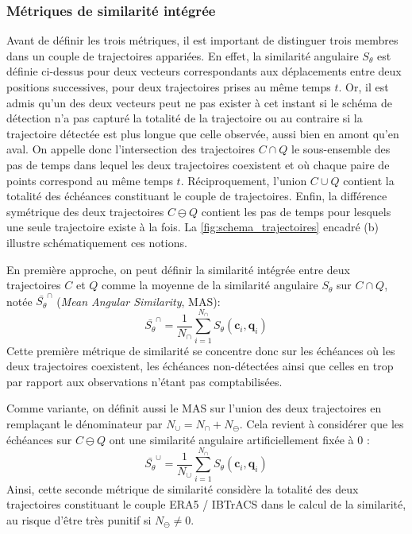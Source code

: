 \documentclass[../main.tex]{subfiles}
\begin{document}
\subsubsection*{Métriques de similarité intégrée}\label{sec:definition_MAS}

Avant de définir les trois métriques, il est important de distinguer trois membres dans un couple de trajectoires appariées. En effet, la similarité angulaire
$S_\theta$ est définie ci-dessus pour deux vecteurs correspondants aux déplacements entre deux positions successives, pour deux trajectoires prises au même
temps $t$. Or, il est admis qu'un des deux vecteurs peut ne pas exister à cet instant si le schéma de détection n'a pas capturé la totalité de la trajectoire ou
au contraire si la trajectoire détectée est plus longue que celle observée, aussi bien en amont qu'en aval. On appelle donc l'intersection des trajectoires $C
\cap Q$ le sous-ensemble des pas de temps dans lequel les deux trajectoires coexistent et où chaque paire de points correspond au même temps $t$.
Réciproquement, l'union $C \cup Q$ contient la totalité des échéances constituant le couple de trajectoires. Enfin, la différence symétrique des deux
trajectoires $C \ominus Q$ contient les pas de temps pour lesquels une seule trajectoire existe à la fois. La \cref{fig:schema_trajectoires} encadré (b)
illustre schématiquement ces notions.

En première approche, on peut définir la similarité intégrée entre deux trajectoires $C$ et $Q$ comme la moyenne de la similarité angulaire $S_\theta$ sur $C
\cap Q$, notée $\bar{S_\theta}^\cap$ (\textit{Mean Angular Similarity}, MAS):
%
\begin{equation}
    \bar{S_\theta}^\cap = \frac{1}{N_\cap} \sum_{i=1}^{N_\cap} S_\theta (\mathbf{c}_i, \mathbf{q}_i) \tag*{MAS$^\cap$}
\end{equation}
%
Cette première métrique de similarité se concentre donc sur les échéances où les deux trajectoires coexistent, les échéances non-détectées ainsi que celles en
trop par rapport aux observations n'étant pas comptabilisées.

Comme variante, on définit aussi le MAS sur l'union des deux trajectoires en remplaçant le dénominateur par $N_\cup = N_\cap + N_\ominus$. Cela revient
à considérer que les échéances sur $C \ominus Q$ ont une similarité angulaire artificiellement fixée à \num{0} :
%
\begin{equation}
    \bar{S_\theta}^\cup = \frac{1}{N_\cup} \sum_{i=1}^{N_\cap} S_\theta (\mathbf{c}_i, \mathbf{q}_i) \tag*{MAS$^\cup$}
\end{equation}
%
Ainsi, cette seconde métrique de similarité considère la totalité des deux trajectoires constituant le couple ERA5 / IBTrACS dans le calcul de la similarité, au
risque d'être très punitif si $N_\ominus \neq 0$.
\end{document}
